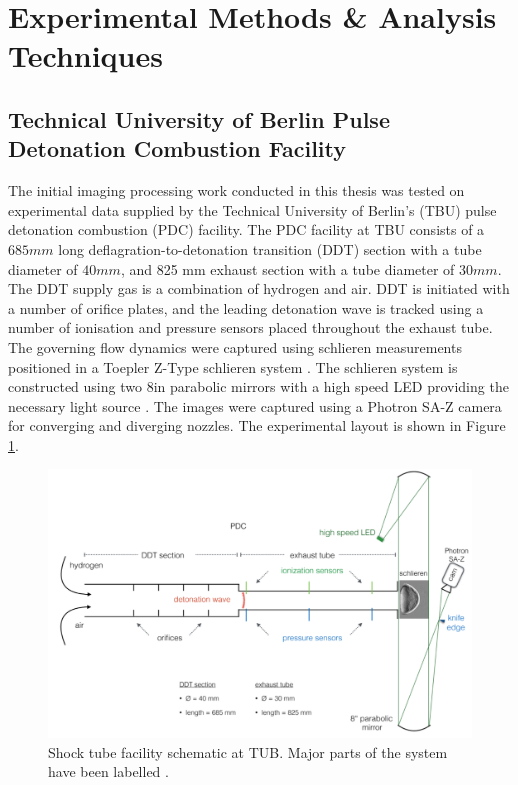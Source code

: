 \newpage
\section{Experimental Methods \& Analysis Techniques}
\subsection{Technical University of Berlin Pulse Detonation Combustion Facility}
The initial imaging processing work conducted in this thesis was tested on experimental data supplied by the Technical University of Berlin's (TBU) pulse detonation combustion (PDC) facility. The PDC facility at TBU consists of a $685mm$ long deflagration-to-detonation transition (DDT) section with a tube diameter of $40mm$, and 825 mm exhaust section with a tube diameter of $30mm$. The DDT supply gas is a combination of hydrogen and air. DDT is initiated with a number of orifice plates, and the leading detonation wave
is tracked using a number of ionisation and pressure sensors placed throughout the exhaust tube. The governing flow dynamics were captured using schlieren measurements positioned in a Toepler Z-Type schlieren system \cite{settles2001schlieren}. The schlieren system is constructed using two 8in parabolic mirrors with a high speed LED providing the necessary light source \cite{willert2012assessment}. The images were captured using a Photron SA-Z camera for converging and diverging nozzles. The experimental layout is shown in Figure \ref{fig:berlin}.

\begin{figure}[H] 
	\centering
	\includegraphics[width=1\textwidth]{berlin.PNG} 
	\caption{Shock tube facility schematic at TUB. Major parts of the
		system have been labelled \cite{bhavberlin}.}
	\label{fig:berlin}
\end{figure}
\newpage
